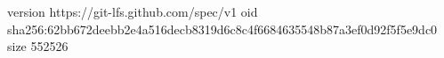 version https://git-lfs.github.com/spec/v1
oid sha256:62bb672deebb2e4a516decb8319d6c8c4f6684635548b87a3ef0d92f5f5e9dc0
size 552526
